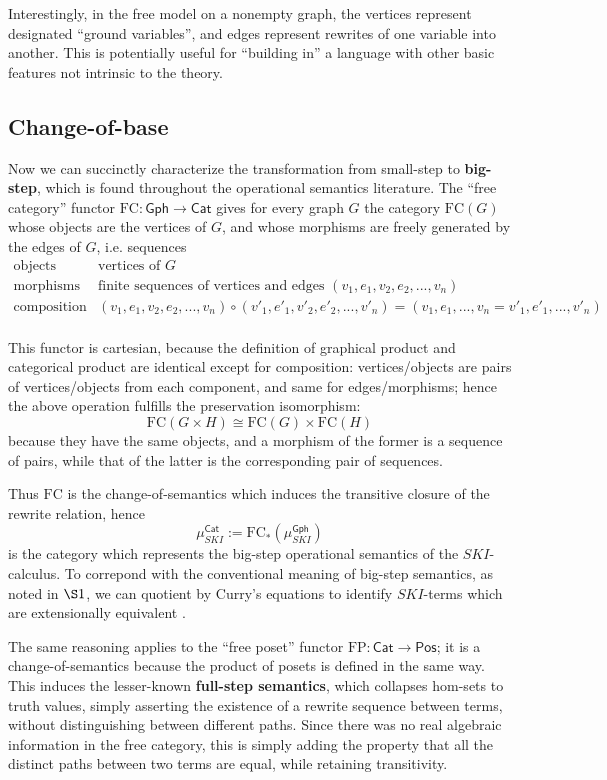 \documentclass{amsart}
\theoremstyle{definition}
\newcommand{\Gph}{\mathsf{Gph}}
\newcommand{\Cat}{\mathsf{Cat}}
\newcommand{\Pos}{\mathsf{Pos}}
\newcommand{\FC}{\mathrm{FC}}
\newcommand{\FP}{\mathrm{FP}}
\newcommand{\maps}{\colon}
\begin{document}
Interestingly, in the free model on a nonempty graph, the vertices represent designated ``ground variables'', and edges represent rewrites of one variable into another. This is potentially useful for ``building in'' a language with other basic features not intrinsic to the theory.

\subsection{Change-of-base}
Now we can succinctly characterize the transformation from small-step to \textbf{big-step}, which is found throughout the operational semantics literature. The ``free category'' functor $\FC\maps \Gph \to \Cat$ gives for every graph $G$ the category $\FC(G)$ whose objects are the vertices of $G$, and whose morphisms are freely generated by the edges of $G$, i.e. sequences 
\[\begin{array}{rl}
\text{objects} & \text{vertices of } G\\
\text{morphisms} & \text{finite sequences of vertices and edges } (v_1,e_1,v_2,e_2,...,v_n)\\
\text{composition} & (v_1,e_1,v_2,e_2,...,v_n) \circ (v'_1,e'_1,v'_2,e'_2,...,v'_n) = (v_1,e_1,...,v_n=v'_1,e'_1,...,v'_n)\\
\end{array}\]

This functor is cartesian, because the definition of graphical product and categorical product are identical except for composition: vertices/objects are pairs of vertices/objects from each component, and same for edges/morphisms; hence the above operation fulfills the preservation isomorphism: $$\FC(G\times H) \cong \FC(G)\times \FC(H)$$ because they have the same objects, and a morphism of the former is a sequence of pairs, while that of the latter is the corresponding pair of sequences.

Thus $\FC$ is the change-of-semantics which induces the transitive closure of the rewrite relation, hence $$\mu_{SKI}^\Cat := \FC_*(\mu_{SKI}^\Gph)$$ is the category which represents the big-step operational semantics of the $SKI$-calculus. To correpond with the conventional meaning of big-step semantics, as noted in $\S1$, we can quotient by Curry's equations to identify $SKI$-terms which are extensionally equivalent \cite{barendregt}.

The same reasoning applies to the ``free poset'' functor $\FP\maps \Cat \to \Pos$; it is a change-of-semantics because the product of posets is defined in the same way. This induces the lesser-known \textbf{full-step semantics}, which collapses hom-sets to truth values, simply asserting the existence of a rewrite sequence between terms, without distinguishing between different paths. Since there was no real algebraic information in the free category, this is simply adding the property that all the distinct paths between two terms are equal, while retaining transitivity.
\end{document}
